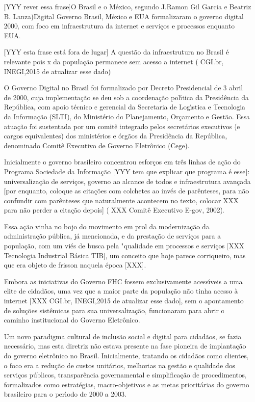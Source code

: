 \documentclass[
12pt,		%
openright,	%
twoside,  %
a4paper,			%
chapter=TITLE,		%
english,			%
french,				%
spanish,			%
brazil				%
]{USPSC-classe/USPSC}
\begin{document}
[YYY rever essa frase]O Brasil e o M\'exico, segundo J.Ramon Gil Garcia e Beatriz B. Lanza)Digital Governo Brasil, M\'exico e EUA formalizaram o governo digital 2000, com foco em infraestrutura da internet e servi\c{c}os e processos enquanto EUA.


[YYY esta frase est\'a fora de lugar] A quest\~ao da infraestrutura no Brasil \'e relevante pois x da popula\c{c}\~ao permanece sem acesso a internet ( CGI.br, INEGI,2015 de atualizar esse dado)


O Governo Digital no Brasil foi formalizado por Decreto Presidencial de 3 abril de 2000, cuja implementa\c{c}\~ao se deu sob a coordena\c{c}\~ao pol\'{\i}tica da Presid\^encia da Rep\'ublica, com apoio t\'ecnico e gerencial da Secretaria de Log\'{\i}stica e Tecnologia da Informa\c{c}\~ao (SLTI), do Minist\'erio do Planejamento, Or\c{c}amento e Gest\~ao. Essa atua\c{c}\~ao foi sustentada por um comit\^e integrado pelos secret\'arios executivos (e cargos equivalentes) dos minist\'erios e \'org\~aos da Presid\^encia da Rep\'ublica, denominado Comit\^e Executivo de Governo Eletr\^onico (Cege).


Inicialmente o governo brasileiro concentrou esfor\c{c}os em tr\^es linhas de a\c{c}\~ao do Programa Sociedade da Informa\c{c}\~ao [YYY tem que explicar que programa \'e esse]: universaliza\c{c}\~ao de servi\c{c}os, governo ao alcance de todos e infraestrutura avan\c{c}ada [por enquanto, coloque as cita\c{c}\~oes com colchetes ao inv\'es de par\^enteses, para n\~ao confundir com par\^enteses que naturalmente acontecem no texto, colocar XXX para n\~ao perder a cita\c{c}\~ao depois] ( XXX Comit\^e Executivo E-gov, 2002).


Essa a\c{c}\~ao vinha no bojo do movimento em prol da moderniza\c{c}\~ao da administra\c{c}\~ao p\'ublica, j\'a mencionada, e da presta\c{c}\~ao de servi\c{c}os para a popula\c{c}\~ao, com um vi\'es de busca pela "qualidade em processos e servi\c{c}os [XXX Tecnologia Industrial B\'asica TIB], um conceito que hoje parece corriqueiro, mas que era objeto de frisson naquela \'epoca [XXX].


Embora as iniciativas do Governo FHC fossem exclusivamente acess\'{\i}veis a uma elite de cidad\~aos, uma vez que a maior parte da popula\c{c}\~ao n\~ao tinha acesso \`a internet [XXX CGI.br, INEGI,2015 de atualizar esse dado], sem o apontamento de solu\c{c}\~oes sist\^emicas para sua universaliza\c{c}\~ao, funcionaram para abrir o caminho institucional do Governo Eletr\^onico.


Um novo paradigma cultural de inclus\~ao social e digital para cidad\~aos, se fazia necess\'ario, mas esta diretriz n\~ao estava presente na fase pioneira de implanta\c{c}\~ao do governo eletr\^onico no Brasil. Inicialmente, tratando os cidad\~aos como clientes, o foco era a redu\c{c}\~ao de custos unit\'arios, melhorias na gest\~ao e qualidade dos servi\c{c}os p\'ublicos, transpar\^encia governamental e simplifica\c{c}\~ao de procedimentos, formalizados como estrat\'egias, macro-objetivos e  as metas priorit\'arias  do governo brasileiro para o per\'{\i}odo de 2000 a 2003.
\end{document}
